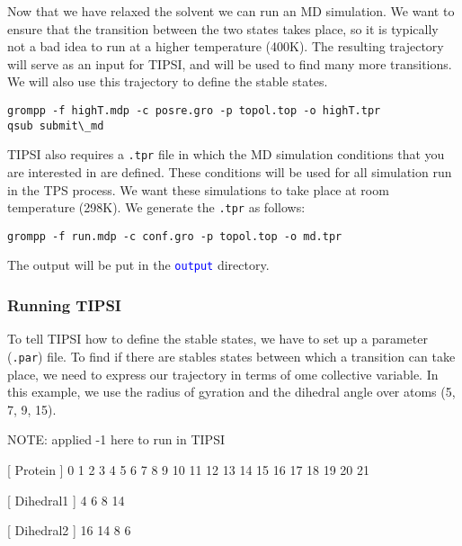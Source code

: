 \documentclass[]{article}
\begin{document}
Now that we have relaxed the solvent we can run an MD simulation. We want to ensure that the transition between the two states takes place, so it is typically not a bad idea to run at a higher temperature (400K). The resulting trajectory will serve as an input for \textsc{TIPSI}, and will be used to find many more transitions. We will also use this trajectory to define the stable states.
%
\begin{lstlisting}
grompp -f highT.mdp -c posre.gro -p topol.top -o highT.tpr
qsub submit\_md
\end{lstlisting}
%
\textsc{TIPSI} also requires a \texttt{.tpr} file in which the MD simulation conditions that you are interested in are defined. These conditions will be used for all simulation run in the TPS process. We want these simulations to take place at room temperature (298K). We generate the \texttt{.tpr} as follows:
%
\begin{lstlisting}
grompp -f run.mdp -c conf.gro -p topol.top -o md.tpr
\end{lstlisting}
%
The output will be put in the \texttt{\textcolor{blue}{output}} directory.

\subsubsection*{Running TIPSI}

To tell \textsc{TIPSI} how to define the stable states, we have to set up a parameter (\texttt{.par}) file. To find if there are stables states between which a transition can take place, we need to express our trajectory in terms of ome collective variable. In this example, we use the radius of gyration and the dihedral angle over atoms (5, 7, 9, 15).

NOTE: applied -1 here to run in TIPSI

[ Protein ]
  0    1    2    3    4    5    6    7    8    9   10   11   12   13   14   15
  16   17   18   19   20   21  

[ Dihedral1 ]
   4    6    8   14

[ Dihedral2 ]
   16   14   8   6
\end{document}
